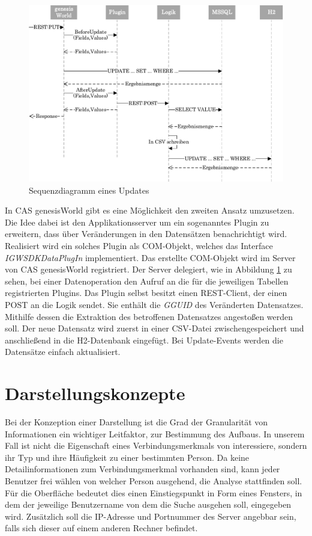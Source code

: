 \begin{figure}[htbp]
\centering
  \includegraphics[width=1.0\textwidth, width=1.0\textwidth]{pics/sequenzdiagramm.pdf}
\caption{Sequenzdiagramm eines Updates}
\label{konzept_sequenz}
\end{figure}

In CAS genesisWorld gibt es eine Möglichkeit den zweiten Ansatz umzusetzen. Die Idee dabei ist den Applikationsserver um ein sogenanntes Plugin zu erweitern, dass über Veränderungen in den Datensätzen benachrichtigt wird. Realisiert wird ein solches Plugin als COM-Objekt, welches das Interface \textit{IGWSDKDataPlugIn} implementiert. Das erstellte COM-Objekt wird im Server von CAS genesisWorld registriert. Der Server delegiert, wie in Abbildung \ref{konzept_sequenz} zu sehen, bei einer Datenoperation den Aufruf an die für die jeweiligen Tabellen registrierten Plugins. Das Plugin selbst besitzt einen REST-Client, der einen POST an die Logik sendet. Sie enthält die \textit{GGUID} des Veränderten Datensatzes. Mithilfe dessen die Extraktion des betroffenen Datensatzes angestoßen werden soll. Der neue Datensatz wird zuerst in einer CSV-Datei zwischengespeichert und anschließend in die H2-Datenbank eingefügt. Bei Update-Events werden die Datensätze einfach aktualisiert. 

\section{Darstellungskonzepte}
\label{ch:Konzeption:sec:Darstellungskonzepte}

Bei der Konzeption einer Darstellung ist die Grad der Granularität von Informationen ein wichtiger Leitfaktor, zur Bestimmung des Aufbaus. In unserem Fall ist nicht die Eigenschaft eines Verbindungsmerkmals von interessiere, sondern ihr Typ und ihre Häufigkeit zu einer bestimmten Person. Da keine Detailinformationen zum Verbindungsmerkmal vorhanden sind, kann jeder Benutzer frei wählen von welcher Person ausgehend, die Analyse stattfinden soll. Für die Oberfläche bedeutet dies einen Einstiegspunkt in Form eines Fensters, in dem der jeweilige Benutzername von dem die Suche ausgehen soll, eingegeben wird. Zusätzlich soll die IP-Adresse und Portnummer des Server angebbar sein, falls sich dieser auf einem anderen Rechner befindet.

